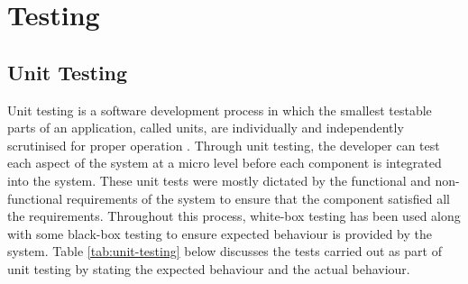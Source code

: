 \chapter{Testing}
\label{Chapter:Testing}

\section{Unit Testing}
Unit testing is a software development process in which the smallest testable parts of an application, called units, are individually and independently scrutinised for proper operation \cite{TechTarget:UnitTesting}. Through unit testing, the developer can test each aspect of the system at a micro level before each component is integrated into the system. These unit tests were mostly dictated by the functional and non-functional requirements of the system to ensure that the component satisfied all the requirements. Throughout this process, white-box testing has been used along with some black-box testing to ensure expected behaviour is provided by the system. Table \ref{tab:unit-testing} below discusses the tests carried out as part of unit testing by stating the expected behaviour and the actual behaviour.

